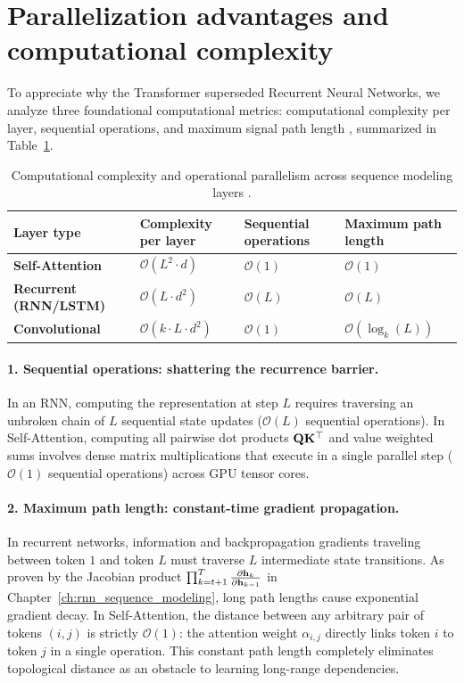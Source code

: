 \documentclass[../../main.tex]{subfiles}
\begin{document}
\clearpage
\section{Parallelization advantages and computational complexity}
\label{sec:computational_complexity}

To appreciate why the Transformer superseded Recurrent Neural Networks, we analyze three foundational computational metrics: computational complexity per layer, sequential operations, and maximum signal path length \cite{vaswani2017}, summarized in Table~\ref{tab:layer_complexity_comparison}.

\begin{table}[htbp]
\centering
\small
\caption{Computational complexity and operational parallelism across sequence modeling layers \cite{vaswani2017}.}
\label{tab:layer_complexity_comparison}
\begin{tabularx}{\textwidth}{lXXX}
\toprule
\textbf{Layer type} & \textbf{Complexity per layer} & \textbf{Sequential operations} & \textbf{Maximum path length} \\
\midrule
\textbf{Self-Attention} & $\mathcal{O}(L^2 \cdot d)$ & $\mathcal{O}(1)$ & $\mathcal{O}(1)$ \\
\textbf{Recurrent (RNN/LSTM)} & $\mathcal{O}(L \cdot d^2)$ & $\mathcal{O}(L)$ & $\mathcal{O}(L)$ \\
\textbf{Convolutional} & $\mathcal{O}(k \cdot L \cdot d^2)$ & $\mathcal{O}(1)$ & $\mathcal{O}(\log_k(L))$ \\
\bottomrule
\end{tabularx}
\end{table}

\paragraph{1. Sequential operations: shattering the recurrence barrier.}
In an RNN, computing the representation at step $L$ requires traversing an unbroken chain of $L$ sequential state updates ($\mathcal{O}(L)$ sequential operations).
In Self-Attention, computing all pairwise dot products $\mathbf{Q} \mathbf{K}^\top$ and value weighted sums involves dense matrix multiplications that execute in a single parallel step ($\mathcal{O}(1)$ sequential operations) across GPU tensor cores.

\paragraph{2. Maximum path length: constant-time gradient propagation.}
In recurrent networks, information and backpropagation gradients traveling between token $1$ and token $L$ must traverse $L$ intermediate state transitions. As proven by the Jacobian product $\prod_{k=t+1}^T \frac{\partial \mathbf{h}_k}{\partial \mathbf{h}_{k-1}}$ in Chapter~\ref{ch:rnn_sequence_modeling}, long path lengths cause exponential gradient decay.
In Self-Attention, the distance between any arbitrary pair of tokens $(i, j)$ is strictly $\mathcal{O}(1)$: the attention weight $\alpha_{i, j}$ directly links token $i$ to token $j$ in a single operation. This constant path length completely eliminates topological distance as an obstacle to learning long-range dependencies.
\end{document}
